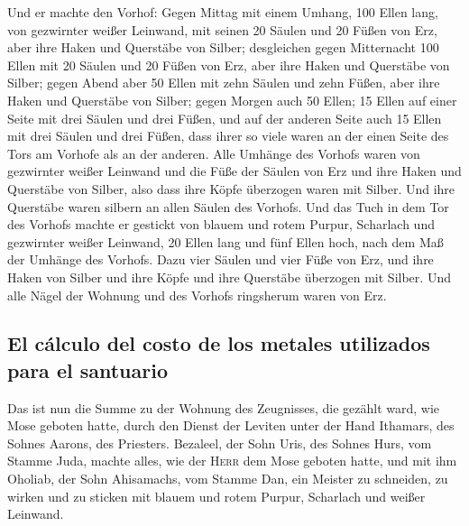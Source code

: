  Und er machte den Vorhof: Gegen Mittag mit einem Umhang,
100 Ellen lang, von gezwirnter weißer Leinwand,  mit
seinen 20 Säulen und 20 Füßen von Erz, aber ihre Haken und Querstäbe von
Silber;  desgleichen gegen Mitternacht 100 Ellen mit 20
Säulen und 20 Füßen von Erz, aber ihre Haken und Querstäbe von Silber;
 gegen Abend aber 50 Ellen mit zehn Säulen und zehn
Füßen, aber ihre Haken und Querstäbe von Silber;  gegen
Morgen auch 50 Ellen;  15 Ellen auf einer Seite mit drei
Säulen und drei Füßen,  und auf der anderen Seite auch 15
Ellen mit drei Säulen und drei Füßen, dass ihrer so viele waren an der
einen Seite des Tors am Vorhofe als an der anderen.  Alle
Umhänge des Vorhofs waren von gezwirnter weißer Leinwand 
und die Füße der Säulen von Erz und ihre Haken und Querstäbe von Silber,
also dass ihre Köpfe überzogen waren mit Silber. Und ihre Querstäbe
waren silbern an allen Säulen des Vorhofs.  Und das Tuch
in dem Tor des Vorhofs machte er gestickt von blauem und rotem Purpur,
Scharlach und gezwirnter weißer Leinwand, 20 Ellen lang und fünf Ellen
hoch, nach dem Maß der Umhänge des Vorhofs.  Dazu vier
Säulen und vier Füße von Erz, und ihre Haken von Silber und ihre Köpfe
und ihre Querstäbe überzogen mit Silber.  Und alle Nägel
der Wohnung und des Vorhofs ringsherum waren von Erz.

\hypertarget{el-cuxe1lculo-del-costo-de-los-metales-utilizados-para-el-santuario}{%
\subsection{El cálculo del costo de los metales utilizados para el
santuario}\label{el-cuxe1lculo-del-costo-de-los-metales-utilizados-para-el-santuario}}

 Das ist nun die Summe zu der Wohnung des Zeugnisses, die
gezählt ward, wie Mose geboten hatte, durch den Dienst der Leviten unter
der Hand Ithamars, des Sohnes Aarons, des Priesters. 
Bezaleel, der Sohn Uris, des Sohnes Hurs, vom Stamme Juda, machte alles,
wie der \textsc{Herr} dem Mose geboten hatte,  und mit
ihm Oholiab, der Sohn Ahisamachs, vom Stamme Dan, ein Meister zu
schneiden, zu wirken und zu sticken mit blauem und rotem Purpur,
Scharlach und weißer Leinwand.

